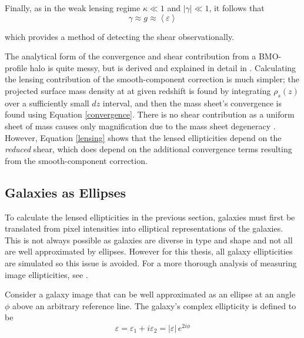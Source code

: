 \documentclass[%
 reprint,
 amsmath,amssymb,
 aps,nofootinbib
]{revtex4-1}
\begin{document}
 \noindent Finally, as in the weak lensing regime ${\kappa\ll1}$ and ${|\gamma|\ll1}$, it follows that
 \begin{equation}
 \gamma\approx g\approx\left<\varepsilon\right>
 \end{equation}

 \noindent which provides a method of detecting the shear observationally.

 The analytical form of the convergence and shear contribution from a BMO-profile halo is quite messy, but is derived and explained in detail in \cite{nfw_bmo}. Calculating the lensing contribution of the smooth-component correction is much simpler; the projected surface mass density at at given redshift is found by integrating $\rho_s(z)$ over a sufficiently small $dz$ interval, and then the mass sheet's convergence is found using Equation \eqref{convergence}. There is no shear contribution as a uniform sheet of mass causes only magnification due to the mass sheet degeneracy \cite{mass_degeneracy}. However, Equation \eqref{lensing} shows that the lensed ellipticities depend on the \textit{reduced} shear, which does depend on the additional convergence terms resulting from the smooth-component correction.

\subsection{Galaxies as Ellipses} \label{galaxies_as_ellipses}

To calculate the lensed ellipticities in the previous section, galaxies must first be translated from pixel intensities into elliptical representations of the galaxies. This is not always possible as galaxies are diverse in type and shape and not all are well approximated by ellipses. However for this thesis, all galaxy ellipticities are simulated so this issue is avoided. For a more thorough analysis of measuring image ellipticities, see \cite{schneider}.

Consider a galaxy image that can be well approximated as an ellipse at an angle $\phi$ above an arbitrary reference line. The galaxy's complex ellipticity is defined to be
\begin{equation}\label{complex_ellipticity}
\varepsilon=\varepsilon_1+i\varepsilon_2=|\varepsilon|\,e^{2i\phi}
\end{equation}
\end{document}
